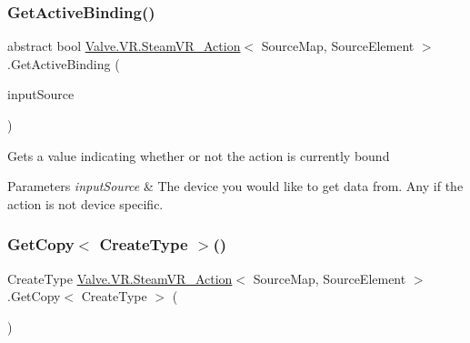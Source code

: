 \mbox{\label{class_valve_1_1_v_r_1_1_steam_v_r___action_a86d2eae9b5b28ea8eec464abf7ea53bb}} 
\subsubsection{\texorpdfstring{GetActiveBinding()}{GetActiveBinding()}\hspace{0.1cm}{\footnotesize\ttfamily [2/2]}}
{\footnotesize\ttfamily abstract bool \mbox{\hyperlink{class_valve_1_1_v_r_1_1_steam_v_r___action}{Valve.\+V\+R.\+Steam\+V\+R\+\_\+\+Action}}$<$ Source\+Map, Source\+Element $>$.Get\+Active\+Binding (\begin{DoxyParamCaption}\item[{\mbox{\hyperlink{namespace_valve_1_1_v_r_a82e5bf501cc3aa155444ee3f0662853f}{Steam\+V\+R\+\_\+\+Input\+\_\+\+Sources}}}]{input\+Source }\end{DoxyParamCaption})\hspace{0.3cm}{\ttfamily [pure virtual]}}



Gets a value indicating whether or not the action is currently bound 


\begin{DoxyParams}{Parameters}
{\em input\+Source} & The device you would like to get data from. Any if the action is not device specific.\\
\hline
\end{DoxyParams}
\mbox{\label{class_valve_1_1_v_r_1_1_steam_v_r___action_a641a73a51f3dc9509bbaf48667c47b71}} 
\subsubsection{\texorpdfstring{GetCopy$<$ CreateType $>$()}{GetCopy< CreateType >()}}
{\footnotesize\ttfamily Create\+Type \mbox{\hyperlink{class_valve_1_1_v_r_1_1_steam_v_r___action}{Valve.\+V\+R.\+Steam\+V\+R\+\_\+\+Action}}$<$ Source\+Map, Source\+Element $>$.Get\+Copy$<$ Create\+Type $>$ (\begin{DoxyParamCaption}{ }\end{DoxyParamCaption})}



